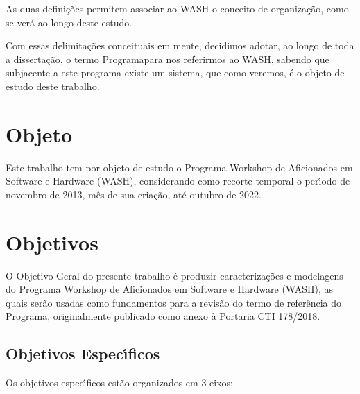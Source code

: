 \documentclass[
12pt,		%
openright,	%
twoside,  %
a4paper,			%
chapter=TITLE,		%
english,			%
french,				%
spanish,			%
brazil				%
]{USPSC-classe/USPSC}
\begin{document}
\noindent\begin{center}\mbox{\centering{}}\end{center}


As duas defini\c{c}\~oes permitem associar ao WASH o conceito de organiza\c{c}\~ao, como se ver\'a ao longo deste estudo.




Com essas delimita\c{c}\~oes conceituais em mente, decidimos adotar, ao longo de toda a disserta\c{c}\~ao, o termo \textquotedbl Programa\textquotedbl  para nos referirmos ao WASH, sabendo que subjacente a este programa existe um sistema, que como veremos, \'e o objeto de estudo deste trabalho.




\section[Objeto]{Objeto}\label{Objeto}
Este trabalho tem por objeto de estudo o Programa Workshop de Aficionados em Software e Hardware (WASH), considerando como recorte temporal o per\'{\i}odo de  novembro de 2013, m\^es de sua cria\c{c}\~ao, at\'e outubro de 2022.




\section[Objetivos]{Objetivos}\label{Objetivos}
O Objetivo Geral do presente trabalho \'e produzir caracteriza\c{c}\~oes e modelagens do Programa Workshop de Aficionados em Software e Hardware (WASH), as quais ser\~ao usadas como fundamentos para a revis\~ao do termo de refer\^encia do Programa, originalmente publicado como anexo \`a Portaria CTI 178/2018.




\subsection[Objetivos Espec\'{\i}ficos]{Objetivos Espec\'{\i}ficos}\label{Objetivos Espec\'{\i}ficos}
Os objetivos espec\'{\i}ficos est\~ao organizados em 3 eixos:
\end{document}
